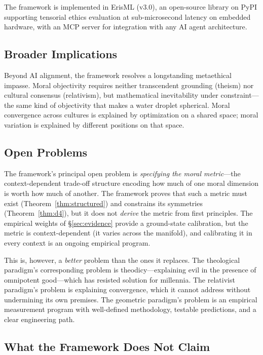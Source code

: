 \documentclass[12pt,letterpaper]{article}
\theoremstyle{definition}
\theoremstyle{remark}
\begin{document}
The framework is implemented in ErisML (v3.0), an open-source library on PyPI supporting tensorial ethics evaluation at sub-microsecond latency on embedded hardware, with an MCP server for integration with any AI agent architecture.

\subsection{Broader Implications}

Beyond AI alignment, the framework resolves a longstanding metaethical impasse. Moral objectivity requires neither transcendent grounding (theism) nor cultural consensus (relativism), but mathematical inevitability under constraint---the same kind of objectivity that makes a water droplet spherical. Moral convergence across cultures is explained by optimization on a shared space; moral variation is explained by different positions on that space.

\subsection{Open Problems}

The framework's principal open problem is \emph{specifying the moral metric}---the context-dependent trade-off structure encoding how much of one moral dimension is worth how much of another. The framework proves that such a metric must exist (Theorem~\ref{thm:structured}) and constrains its symmetries (Theorem~\ref{thm:d4}), but it does not \emph{derive} the metric from first principles. The empirical weights of \S\ref{sec:evidence} provide a ground-state calibration, but the metric is context-dependent (it varies across the manifold), and calibrating it in every context is an ongoing empirical program.

This is, however, a \emph{better} problem than the ones it replaces. The theological paradigm's corresponding problem is theodicy---explaining evil in the presence of omnipotent good---which has resisted solution for millennia. The relativist paradigm's problem is explaining convergence, which it cannot address without undermining its own premises. The geometric paradigm's problem is an empirical measurement program with well-defined methodology, testable predictions, and a clear engineering path.

\subsection{What the Framework Does Not Claim}
\end{document}
